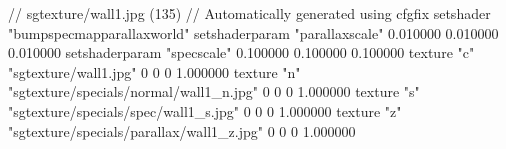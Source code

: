 // sgtexture/wall1.jpg (135)
// Automatically generated using cfgfix
setshader "bumpspecmapparallaxworld"
setshaderparam "parallaxscale" 0.010000 0.010000 0.010000
setshaderparam "specscale" 0.100000 0.100000 0.100000
texture "c" "sgtexture/wall1.jpg" 0 0 0 1.000000
texture "n" "sgtexture/specials/normal/wall1_n.jpg" 0 0 0 1.000000
texture "s" "sgtexture/specials/spec/wall1_s.jpg" 0 0 0 1.000000
texture "z" "sgtexture/specials/parallax/wall1_z.jpg" 0 0 0 1.000000
